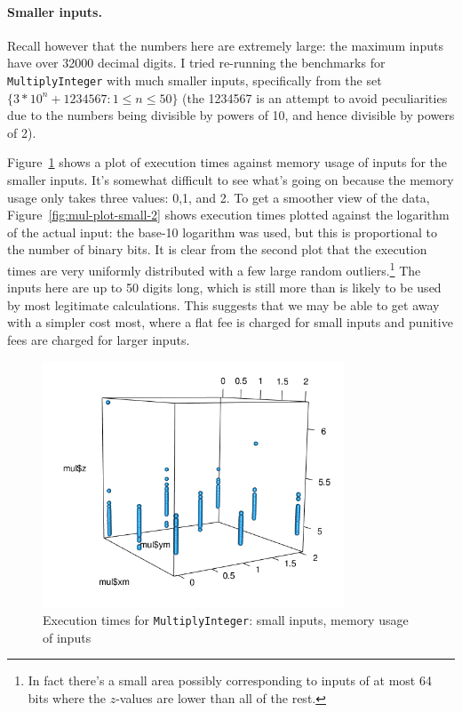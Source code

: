 \documentclass[a4paper]{article}
\begin{document}
\paragraph{Smaller inputs.}
Recall however that the numbers here are extremely large: the maximum
inputs have over 32000 decimal digits.  I tried re-running the
benchmarks for \texttt{MultiplyInteger} with much smaller inputs,
specifically from the set $\{3*10^n+1234567: 1 \le n \le50\}$ (the
1234567 is an attempt to avoid peculiarities due to the numbers being
divisible by powers of 10, and hence divisible by powers of 2).

Figure~\ref{fig:mul-plot-small-1} shows a plot of execution times
against memory usage of inputs for the smaller inputs.  It's somewhat
difficult to see what's going on because the memory usage only takes
three values: 0,1, and 2.  To get a smoother view of the data,
Figure~\ref{fig:mul-plot-small-2} shows execution times plotted against
the logarithm of the actual input: the base-10 logarithm was used, but
this is proportional to the number of binary bits.  It is clear from
the second plot that the execution times are very uniformly
distributed with a few large random outliers.\footnote{
  In fact there's a small area possibly corresponding to inputs
  of at most 64 bits where the $z$-values are lower than all of the rest.}
The inputs here are up
to 50 digits long, which is still more than is likely to be used by
most legitimate calculations. This suggests that we may be able to get
away with a simpler cost most, where a flat fee is charged for small inputs
and punitive fees are charged for larger inputs.


\begin{figure}[!ht]
\centering
  \includegraphics[width=0.8\textwidth]{figures/mul-small-1.png}
  \caption{Execution times for \texttt{MultiplyInteger}: small inputs, memory usage of inputs}
  \label{fig:mul-plot-small-1}
\end{figure}
\end{document}
